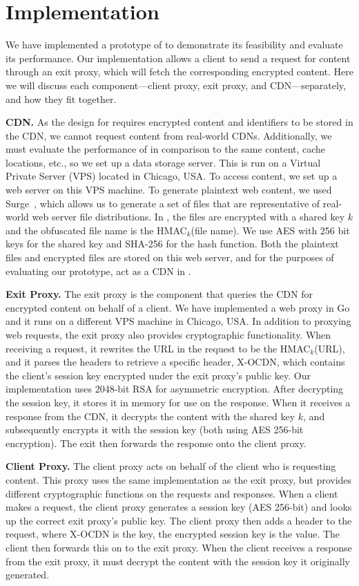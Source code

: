\section{Implementation}
\label{sec:implementation}

We have implemented a prototype of \system{} to demonstrate its feasibility and 
evaluate its performance.  Our implementation allows a client to send a request 
for content through an exit proxy, which will fetch the corresponding 
encrypted content.  Here we will discuss each component---client proxy, exit proxy, 
and CDN---separately, and how they fit together.

{\bf CDN.} As the design for \system{} requires encrypted content and identifiers 
to be stored in the CDN, we cannot request content from real-world CDNs.  Additionally, 
we must evaluate the performance of \system{} in comparison to the same content, cache locations, etc., so 
we set up a data storage server.  This is run on a Virtual Private Server (VPS) located in 
Chicago, USA.  To access content, we set up a web server on this VPS machine.  To generate 
plaintext web content, we used Surge~\cite{barford1998generating}, which allows us 
to generate a set of files that are representative of real-world web server file distributions.  
In \system{}, the files are encrypted with a shared key $k$ and the obfuscated file name is the 
HMAC$_{k}$(file name).  We use AES with 256 bit keys for the shared key and SHA-256 for the 
hash function.  Both the plaintext files and encrypted files are stored on this web server, and 
for the purposes of evaluating our prototype, act as a CDN in \system{}.

{\bf Exit Proxy.} The exit proxy is the component that queries the CDN for encrypted 
content on behalf of a client.  We have implemented a web proxy in Go and it runs on 
a different VPS machine in Chicago, USA.  In addition to proxying web requests, the exit 
proxy also provides cryptographic functionality.  When receiving a request, it rewrites
the URL in the request to be the HMAC$_{k}$(URL), and it parses the headers to retrieve a 
specific header, X-OCDN, which contains the client's session key encrypted under the exit 
proxy's public key.  Our implementation uses 2048-bit RSA for asymmetric encryption.  After 
decrypting the session key, it stores it in memory for use on the response.  When 
it receives a response from the CDN, it decrypts the content with the shared key $k$, and 
subsequently encrypts it with the session key (both using AES 256-bit encryption).  The 
exit then forwards the response onto the client proxy.

{\bf Client Proxy.} The client proxy acts on behalf of the client who is requesting 
content.  This proxy uses the same implementation as the exit proxy, but provides 
different cryptographic functions on the requests and responses.  When a client makes 
a request, the client proxy generates a session key  (AES 256-bit) and looks up the correct exit proxy's 
public key.  The client proxy then adds a header to the request, 
where X-OCDN is the key, the encrypted session key is the value.  The client then forwards this on to the 
exit proxy.  When the client receives a response from the exit proxy, it must decrypt the content 
with the session key it originally generated.   
